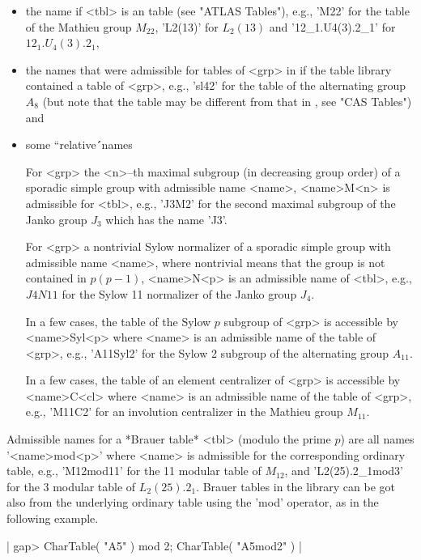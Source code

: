 \begin{itemize}
\item the {\ATLAS} name if <tbl> is an {\ATLAS} table (see "ATLAS Tables"),
      e.g., 'M22' for the table of the Mathieu group $M_{22}$, 'L2(13)'
      for $L_2(13)$ and '12\_1.U4(3).2\_1' for $12_1.U_4(3).2_1$,
\item the names that were admissible for tables of <grp> in {\CAS} if the
      {\CAS} table library contained a table of <grp>, e.g., 'sl42' for
      the table of the alternating group $A_8$ (but note that the table
      may be different from that in {\CAS}, see "CAS Tables") and
\item some ``relative\'\'\ names\:

      For <grp> the <n>--th maximal subgroup (in decreasing group order)
      of a sporadic simple group with admissible name <name>, <name>M<n>
      is admissible for <tbl>, e.g., 'J3M2' for the second maximal
      subgroup of the Janko group $J_3$ which has the name 'J3'.

      For <grp> a nontrivial Sylow normalizer of a sporadic simple group
      with admissible name <name>, where nontrivial means that the group
      is not contained in $p$\:$(p-1)$, <name>N<p> is an admissible name
      of <tbl>, e.g., $J4N11$ for the Sylow 11 normalizer of the Janko
      group $J_4$.

      In a few cases, the table of the Sylow $p$ subgroup of <grp> is
      accessible by <name>Syl<p> where <name> is an admissible name of
      the table of <grp>, e.g., 'A11Syl2' for the Sylow 2 subgroup of the
      alternating group $A_{11}$.

      In a few cases, the table of an element centralizer of <grp> is
      accessible by <name>C<cl> where <name> is an admissible name of the
      table of <grp>, e.g., 'M11C2' for an involution centralizer in the
      Mathieu group $M_{11}$.
\end{itemize}

Admissible  names for a  *Brauer table* <tbl> (modulo the  prime $p$) are
all names '<name>mod<p>' where <name> is admissible for the corresponding
ordinary  table, e.g., 'M12mod11'  for the 11 modular table  of $M_{12}$,
and 'L2(25).2\_1mod3' for the 3 modular table of $L_2(25).2_1$.
Brauer tables in the library can be got also from the underlying ordinary
table using the 'mod' operator, as in the following example.

|    gap> CharTable( "A5" ) mod 2;
    CharTable( "A5mod2" ) |

